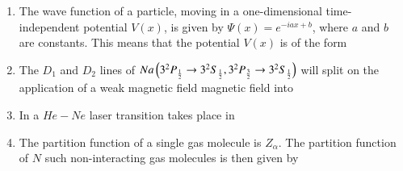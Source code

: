\documentclass[journal]{IEEEtran}
\begin{document}
\begin{enumerate}
    \begin{table}[H]
        \centering
        
    \end{table} 
    \item The wave function of a particle, moving in a one-dimensional time-independent potential  $V(x)$, is given by $\Psi(x) = e^{-iax + b}$, where $a$ and $b$ are constants. This means that the potential $V(x)$ is of the form 
    \begin{enumerate}
    \end{enumerate}
    \item The $D_1$ and $D_2$ lines of $Na\left(3^2P_{\frac{1}{2}} \to 3^2S_{\frac{1}{2}}, 3^2P_{\frac{3}{2}} \to 3^2S_{\frac{1}{2}}\right)$ will split on the application of a weak magnetic field magnetic field into 
    \begin{enumerate}
    \end{enumerate}
    \item In a $He-Ne$ laser transition takes place in 
    \begin{enumerate}
    \end{enumerate}
    \item The partition function of a single gas molecule is $Z_{\alpha}$. The partition function of $N$ such non-interacting gas molecules is then given by

\end{enumerate}
\end{document}
